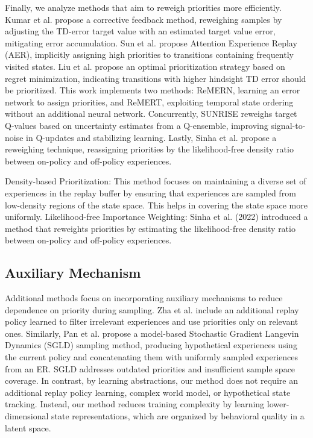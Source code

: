 Finally, we analyze methods that aim to reweigh priorities more efficiently. Kumar et al. \cite{kumar2020discor}  propose a corrective feedback method, reweighing samples by adjusting the TD-error target value with an estimated target value error, mitigating error accumulation. Sun et al. \cite{sun2020attentive} propose Attention Experience Replay (AER), implicitly assigning high priorities to transitions containing frequently visited states. Liu et al. \cite{liu2021regret} propose an optimal prioritization strategy based on regret minimization, indicating transitions with higher hindsight TD error should be prioritized. This work implements two methods: ReMERN, learning an error network to assign priorities, and ReMERT, exploiting temporal state ordering without an additional neural network. Concurrently, SUNRISE \cite{lee2021sunrise} reweighs target Q-values based on uncertainty estimates from a Q-ensemble, improving signal-to-noise in Q-updates and stabilizing learning. Lastly, Sinha et al. \cite{sinha2022experience}  propose a reweighing technique, reassigning priorities by the likelihood-free density ratio between on-policy and off-policy experiences.


Density-based Prioritization: This method focuses on maintaining a diverse set of experiences in the replay buffer by ensuring that experiences are sampled from low-density regions of the state space. This helps in covering the state space more uniformly.
Likelihood-free Importance Weighting: Sinha et al. (2022) introduced a method that reweights priorities by estimating the likelihood-free density ratio between on-policy and off-policy experiences.


\subsection{Auxiliary Mechanism}

Additional methods focus on incorporating auxiliary mechanisms to reduce dependence on priority during sampling. Zha et al. \cite{zha2019experience} include an additional replay policy learned to filter irrelevant experiences and use priorities only on relevant ones. Similarly, Pan et al. \cite{pan2022understanding} propose a model-based Stochastic Gradient Langevin Dynamics (SGLD) sampling method, producing hypothetical experiences using the current policy and concatenating them with uniformly sampled experiences from an ER. SGLD addresses outdated priorities and insufficient sample space coverage. In contrast, by learning abstractions, our method does not require an additional replay policy learning, complex world model, or hypothetical state tracking. Instead, our method reduces training complexity by learning lower-dimensional state representations, which are organized by behavioral quality in a latent space.



